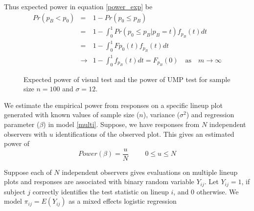 \documentclass{article}
\begin{document}
Thus expected power in equation \ref{power_exp} be
\begin{eqnarray*}
 Pr(p_{B} < p_0) &=& 1- Pr( p_0 \le p_{B} ) \\
  &=& 1- \int_{0}^{1}{Pr( p_0 \le p_{B} |p_{B} =t) f_{p_{B} }(t)dt } \\
  &=& 1-  \int_{0}^{1}{F{p_0}(t) f_{p_{B} }(t)dt }    \\
  & \rightarrow &1-  \int_{0}^{1}{ f_{p_{B} }(t)dt }  = F_{p_B}(0) \quad \text{as} \quad m \rightarrow \infty
\end{eqnarray*}


\begin{figure}[hbtp]
   \centering
       \caption{Expected power of visual test  and the power of UMP test for sample size $n =100$ and $\sigma = 12$.}
       \label{fig:power_expected}
\end{figure}


We estimate the empirical power from responses on a specific lineup plot  generated with known values of sample size ($n$), variance ($\sigma^2$) and regression parameter ($\beta$) in model \ref{multi}. Suppose, we have responses from $N$ independent observers with $u$ identifications of the observed plot. This gives an estimated power of
\begin{equation}\label{power_est} Power(\beta)=\frac{u}{N} \hspace{1cm} 0 \le u \le N \end{equation}

Suppose each of $N$ independent observers gives evaluations on multiple lineup plots and responses are associated with binary random variable $Y_{ij}$. Let $Y_{ij} = 1$, if subject $j$ correctly identifies the test statistic on lineup $i$, and 0 otherwise.
We model $\pi_{ij} = E(Y_{ij})$ as  a mixed effects logistic regression
\end{document}

